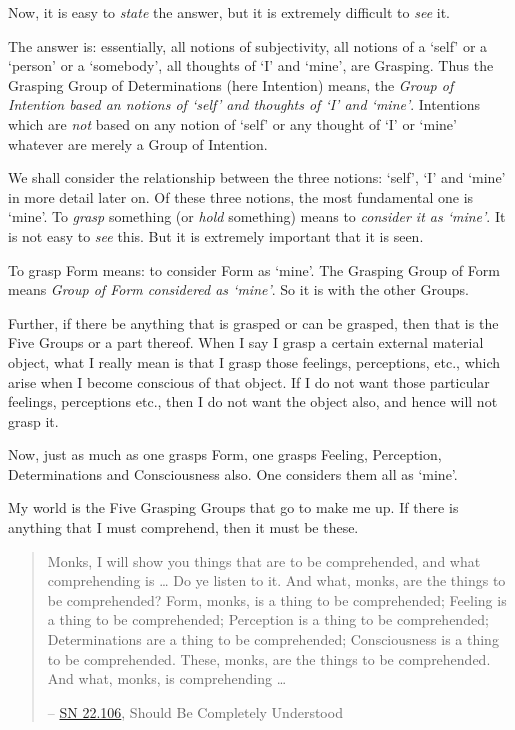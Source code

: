 Now, it is easy to \emph{state} the answer, but it is extremely difficult to \emph{see} it.

The answer is: essentially, all notions of subjectivity, all notions of a `self' or a `person' or a `somebody', all thoughts of `I' and `mine', are Grasping. Thus the Grasping Group of Determinations (here Intention) means, the \emph{Group of Intention based an notions of `self' and thoughts of `I' and `mine'}. Intentions which are \emph{not} based on any notion of `self' or any thought of `I' or `mine' whatever are merely a Group of Intention.

We shall consider the relationship between the three notions: `self', `I' and `mine' in more detail later on. Of these three notions, the most fundamental one is `mine'. To \emph{grasp} something (or \emph{hold} something) means to \emph{consider it as `mine'}. It is not easy to \emph{see} this. But it is extremely important that it is seen.

To grasp Form means: to consider Form as `mine'. The Grasping Group of Form means \emph{Group of Form considered as `mine'}. So it is with the other Groups.

Further, if there be anything that is grasped or can be grasped, then that is the Five Groups or a part thereof. When I say I grasp a certain external material object, what I really mean is that I grasp those feelings, perceptions, etc., which arise when I become conscious of that object. If I do not want those particular feelings, perceptions etc., then I do not want the object also, and hence will not grasp it.

Now, just as much as one grasps Form, one grasps Feeling, Perception, Determinations and Consciousness also. One considers them all as `mine'.

My world is the Five Grasping Groups that go to make me up. If there is anything that I must comprehend, then it must be these.

\begin{quote}
Monks, I will show you things that are to be comprehended, and what comprehending is \ldots\hspace{0pt} Do ye listen to it. And what, monks, are the things to be comprehended? Form, monks, is a thing to be comprehended; Feeling is a thing to be comprehended; Perception is a thing to be comprehended; Determinations are a thing to be comprehended; Consciousness is a thing to be comprehended. These, monks, are the things to be comprehended. And what, monks, is comprehending \ldots\hspace{0pt}

 -- \href{https://suttacentral.net/sn22.106/en/sujato}{SN 22.106}, Should Be Completely Understood
\end{quote}

